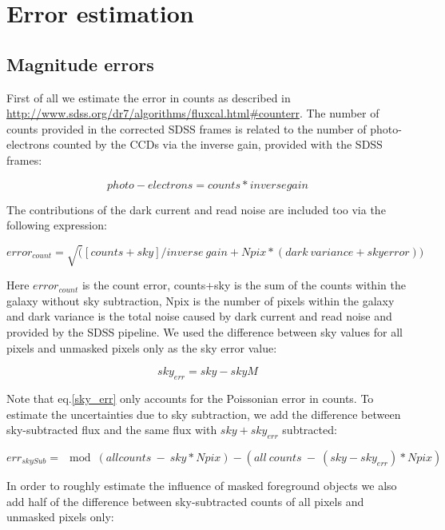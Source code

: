 \documentclass[apj, onecolumn]{emulateapj}
\begin{document}
\section{Error estimation}
\subsection{Magnitude errors}
First of all we estimate the error in counts as described in \url{http://www.sdss.org/dr7/algorithms/fluxcal.html#counterr}. The number of counts provided in the corrected SDSS frames is related to the number of photo-electrons counted by the CCDs via the inverse gain, provided with the SDSS frames:

\begin{equation}
photo-electrons = counts * inverse gain
\end{equation}

The contributions of the dark current and read noise are included too via the following expression:

\begin{equation}
error_{count} = \sqrt([counts+sky]/inverse\ gain + Npix*(dark\ variance + sky error))
\end{equation}

Here $error_{count}$ is the count error, counts+sky is the sum of the counts within the galaxy without sky subtraction, Npix is the number of pixels within the galaxy and dark variance is the total noise caused by dark current and read noise and provided by the SDSS pipeline. We used the difference between sky values for all pixels and unmasked pixels only as the sky error value:

\begin{equation}
sky_{err} = sky - skyM
\label{sky_err}
\end{equation}

Note that eq.\ref{sky_err} only accounts for the Poissonian error in counts. To estimate the uncertainties due to sky subtraction, we add the difference between sky-subtracted flux and the same flux with $sky + sky_{err}$ subtracted:

\begin{equation}
err_{skySub} = \mod{(all counts\ -\ sky*Npix) - (all\ counts\ -\ (sky-sky_{err})*Npix)}
\label{sky_err}
\end{equation}

In order to roughly estimate the influence of masked foreground objects we also add half of the difference between sky-subtracted counts of all pixels and unmasked pixels only:
\end{document}
